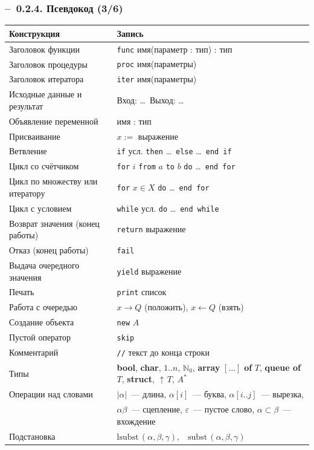 \documentclass[mathserif,12pt,aspectratio=169]{beamer}
\def\Assign{\operatorname{:=}}
\def\Pointer{\operatorname{\uparrow\!}}
\def\Er{{\color{red}\textbf{--}\ }}
\begin{document}
\begin{frame}
\frametitle{\Er 0.2.4. Псевдокод (3/6)}

\begin{center}\scriptsize
\begin{tabular}{|l|l|}
\hline
Конструкция & Запись \\
\hline
Заголовок функции & \texttt{func} имя(параметр : тип) : тип \\
Заголовок процедуры & \texttt{proc} имя(параметры) \\
Заголовок итератора & \texttt{iter} имя(параметры) \\
Исходные данные и результат & Вход: \dots\ Выход: \dots \\
Объявление переменной & имя : тип \\
Присваивание & $x \Assign$ выражение \\
Ветвление & \texttt{if} усл. \texttt{then} \dots\ \texttt{else} \dots\
\texttt{end if} \\
Цикл со счётчиком & \texttt{for} $i$ \texttt{from} $a$ \texttt{to} $b$
\texttt{do} \dots\ \texttt{end for} \\
Цикл по множеству или итератору & \texttt{for} $x\in X$ \texttt{do} \dots\
\texttt{end for} \\
Цикл с условием & \texttt{while} усл. \texttt{do} \dots\ \texttt{end while} \\
Возврат значения (конец работы) & \texttt{return} выражение \\
Отказ (конец работы) & \texttt{fail} \\
Выдача очередного значения & \texttt{yield} выражение \\
Печать & \texttt{print} список \\
Работа с очередью & $x\to Q$ (положить), $x\leftarrow Q$ (взять) \\
Создание объекта & \texttt{new} $A$ \\
Пустой оператор & \texttt{skip} \\
Комментарий & \texttt{//} текст до конца строки \\
\hline
Типы & \textbf{bool}, \textbf{char}, $1..n$, $\mathbb{N}_0$, \textbf{array}
$[\dots]$ \textbf{of} $T$, \textbf{queue of} $T$, \textbf{struct},
$\Pointer T$, $A^*$ \\
Операции над словами & $|\alpha|$~--- длина, $\alpha[i]$~--- буква,
$\alpha[i..j]$~--- вырезка, \\
 & $\alpha\beta$~--- сцепление, $\varepsilon$~--- пустое слово,
$\alpha\subset\beta$~--- вхождение \\
Подстановка & $\mathrm{lsubst}\,(\alpha,\beta,\gamma)$,\ \
$\mathrm{subst}\,(\alpha,\beta,\gamma)$ \\
\hline
\end{tabular}
\end{center}
\end{frame}
\end{document}
